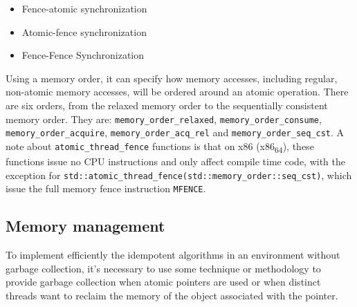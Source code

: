 \begin{itemize}
\item Fence-atomic synchronization
\item Atomic-fence synchronization
\item Fence-Fence Synchronization
\end{itemize}

Using a memory order\cite{memoryOrderCpp2020}, it can specify how memory accesses, including regular, non-atomic memory accesses, will be
ordered around an atomic operation. There are six orders, from the
relaxed memory order to the sequentially consistent memory order. They are:
\texttt{memory\_order\_relaxed}, \texttt{memory\_order\_consume}, \texttt{memory\_order\_acquire},
\texttt{memory\_order\_acq\_rel} and \texttt{memory\_order\_seq\_cst}. A note about
\texttt{atomic\_thread\_fence} functions is that on x86 (x86\textsubscript{64}), these functions
issue no CPU instructions and only affect compile time code, with the exception
for \texttt{std::atomic\_thread\_fence(std::memory\_order::seq\_cst)}, which issue the
full memory fence instruction \texttt{MFENCE}.

\subsection{Memory management}
\label{sec:org1ca9ee9}

To implement efficiently the idempotent algorithms in an environment without
garbage collection, it's necessary to use some technique or methodology to
provide garbage collection when atomic pointers are used or when distinct
threads want to reclaim the memory of the object associated with the pointer.

